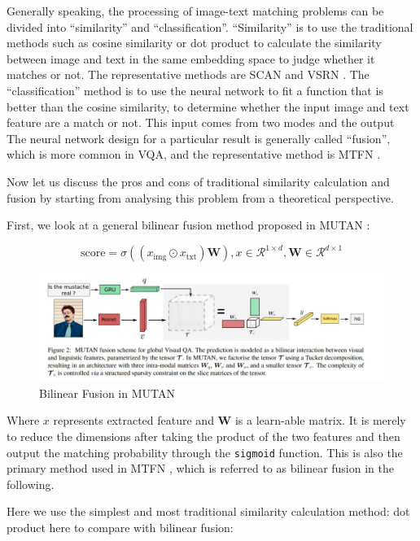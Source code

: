 Generally speaking, the processing of image-text matching problems can be divided into ``similarity'' and ``classification''. ``Similarity'' is to use the traditional methods such as cosine similarity or dot product to calculate the similarity between image and text in the same embedding space to judge whether it matches or not. The representative methods are SCAN \cite{scan} and VSRN \cite{VSRN}. The ``classification'' method is to use the neural network to fit a function that is better than the cosine similarity, to determine whether the input image and text feature are a match or not. This input comes from two modes and the output The neural network design for a particular result is generally called ``fusion'', which is more common in VQA, and the representative method is MTFN \cite{MTFN}.

Now let us discuss the pros and cons of traditional similarity calculation and fusion by starting from analysing this problem from a theoretical perspective.

First, we look at a general bilinear fusion method proposed in MUTAN \cite{benyounes2017mutan}:

$$
\text {score}=\sigma\left(\left(x_{\text {img}} \odot x_{\text {txt}}\right) \mathbf{W}\right), x \in \mathcal{R}^{1 \times d}, \mathbf{W} \in \mathcal{R}^{d \times 1}
$$

\begin{figure}[h!]
\centering
\includegraphics[width=\textwidth]{MUTAN.pdf}
\caption{Bilinear Fusion in MUTAN \cite{benyounes2017mutan}}
\label{fig:mutan}
\end{figure}

Where $x$ represents extracted feature and $\mathbf{W}$ is a learn-able matrix. It is merely to reduce the dimensions after taking the product of the two features and then output the matching probability through the \verb|sigmoid| function. This is also the primary method used in MTFN \cite{MTFN}, which is referred to as bilinear fusion in the following.

Here we use the simplest and most traditional similarity calculation method: dot product here to compare with bilinear fusion:

